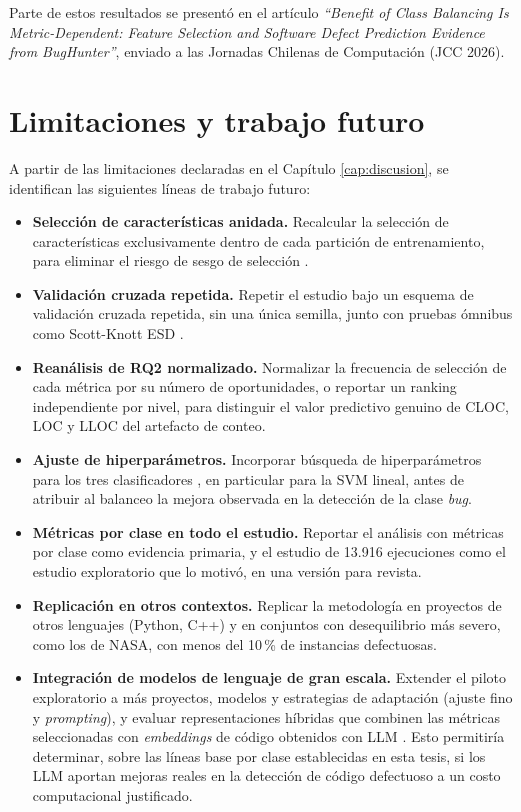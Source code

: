Parte de estos resultados se presentó en el artículo \textit{``Benefit of Class Balancing Is Metric-Dependent: Feature Selection and Software Defect Prediction Evidence from BugHunter''}, enviado a las Jornadas Chilenas de Computación (JCC 2026).

\section*{Limitaciones y trabajo futuro}

A partir de las limitaciones declaradas en el Capítulo \ref{cap:discusion}, se identifican las siguientes líneas de trabajo futuro:

\begin{itemize}
    \item \textbf{Selección de características anidada.} Recalcular la selección de características exclusivamente dentro de cada partición de entrenamiento, para eliminar el riesgo de sesgo de selección \cite{ambroise2002,cawley2010}.
    \item \textbf{Validación cruzada repetida.} Repetir el estudio bajo un esquema de validación cruzada repetida, sin una única semilla, junto con pruebas ómnibus como Scott-Knott ESD \cite{tantithamthavorn2017}.
    \item \textbf{Reanálisis de RQ2 normalizado.} Normalizar la frecuencia de selección de cada métrica por su número de oportunidades, o reportar un ranking independiente por nivel, para distinguir el valor predictivo genuino de CLOC, LOC y LLOC del artefacto de conteo.
    \item \textbf{Ajuste de hiperparámetros.} Incorporar búsqueda de hiperparámetros para los tres clasificadores \cite{tantithamthavorn2019}, en particular para la SVM lineal, antes de atribuir al balanceo la mejora observada en la detección de la clase \textit{bug}.
    \item \textbf{Métricas por clase en todo el estudio.} Reportar el análisis con métricas por clase como evidencia primaria, y el estudio de 13.916 ejecuciones como el estudio exploratorio que lo motivó, en una versión para revista.
    \item \textbf{Replicación en otros contextos.} Replicar la metodología en proyectos de otros lenguajes (Python, C++) y en conjuntos con desequilibrio más severo, como los de NASA, con menos del 10\,\% de instancias defectuosas.
    \item \textbf{Integración de modelos de lenguaje de gran escala.} Extender el piloto exploratorio a más proyectos, modelos y estrategias de adaptación (ajuste fino y \textit{prompting}), y evaluar representaciones híbridas que combinen las métricas seleccionadas con \textit{embeddings} de código obtenidos con LLM \cite{jaiswal2026llm}. Esto permitiría determinar, sobre las líneas base por clase establecidas en esta tesis, si los LLM aportan mejoras reales en la detección de código defectuoso a un costo computacional justificado.
\end{itemize}
